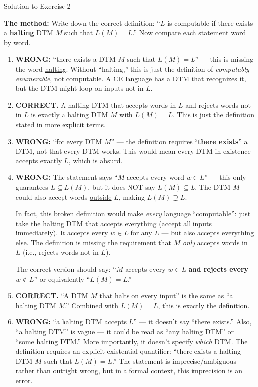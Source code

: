 \documentclass[11pt,a4paper]{article}
\begin{document}
\begin{solutionbox}{Solution to Exercise 2}

\textbf{The method:} Write down the correct definition: ``$L$ is computable if there exists a \textbf{halting} DTM $M$ such that $L(M) = L$.'' Now compare each statement word by word.

\begin{enumerate}
    \item \textbf{WRONG:} ``there exists a DTM $M$ such that $L(M) = L$'' --- this is missing the word \underline{halting}. Without ``halting,'' this is just the definition of \emph{computably-enumerable}, not computable. A CE language has a DTM that recognizes it, but the DTM might loop on inputs not in $L$.

    \item \textbf{CORRECT.} A halting DTM that accepts words in $L$ and rejects words not in $L$ is exactly a halting DTM $M$ with $L(M) = L$. This is just the definition stated in more explicit terms.

    \item \textbf{WRONG:} ``\underline{for every} DTM $M$'' --- the definition requires ``\textbf{there exists}'' a DTM, not that every DTM works. This would mean every DTM in existence accepts exactly $L$, which is absurd.

    \item \textbf{WRONG:} The statement says ``$M$ accepts every word $w \in L$'' --- this only guarantees $L \subseteq L(M)$, but it does NOT say $L(M) \subseteq L$. The DTM $M$ could also accept words \underline{outside} $L$, making $L(M) \supsetneq L$.

    In fact, this broken definition would make \emph{every} language ``computable'': just take the halting DTM that accepts everything (accept all inputs immediately). It accepts every $w \in L$ for any $L$ --- but also accepts everything else. The definition is missing the requirement that $M$ \emph{only} accepts words in $L$ (i.e., rejects words not in $L$).

    The correct version should say: ``$M$ accepts every $w \in L$ \textbf{and rejects every} $w \notin L$'' or equivalently ``$L(M) = L$.''

    \item \textbf{CORRECT.} ``A DTM $M$ that halts on every input'' is the same as ``a halting DTM $M$.'' Combined with $L(M) = L$, this is exactly the definition.

    \item \textbf{WRONG:} ``\underline{a halting DTM} accepts $L$'' --- it doesn't say ``there exists.'' Also, ``a halting DTM'' is vague --- it could be read as ``any halting DTM'' or ``some halting DTM.'' More importantly, it doesn't specify \emph{which} DTM. The definition requires an explicit existential quantifier: ``there exists a halting DTM $M$ such that $L(M) = L$.'' The statement is imprecise/ambiguous rather than outright wrong, but in a formal context, this imprecision is an error.
\end{enumerate}


\end{solutionbox}
\end{document}
